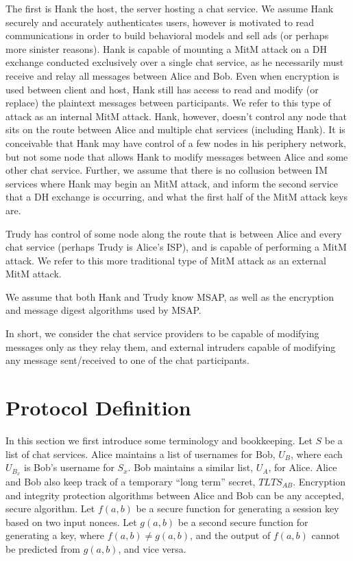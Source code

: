 \documentclass[twoside,10pt]{article}
\begin{document}
\begin{multicols}{2}
The first is Hank the host, the server hosting a chat service.  We assume Hank securely and accurately authenticates users, however is motivated to read communications in order to build behavioral models and sell ads (or perhaps more sinister reasons).  Hank is capable of mounting a MitM attack on a DH exchange conducted exclusively over a single chat service, as he necessarily must receive and relay all messages between Alice and Bob.  Even when encryption is used between client and host, Hank still has access to read and modify (or replace) the plaintext messages between participants.  We refer to this type of attack as an internal MitM attack.  Hank, however, doesn't  control any node that sits on the route between Alice and multiple chat services (including Hank).  It is conceivable that Hank may have control of a few nodes in his periphery network, but not some node that allows Hank to modify messages between Alice and some other chat service.  Further, we assume that there is no collusion between IM services where Hank may begin an MitM attack, and inform the second service that a DH exchange is occurring, and what the first half of the MitM attack keys are.

Trudy has control of some node along the route that is between Alice and every chat service (perhaps Trudy is Alice's ISP), and is capable of performing a MitM attack.  We refer to this more traditional type of MitM attack as an external MitM attack.

We assume that both Hank and Trudy know MSAP, as well as the encryption and message digest algorithms used by MSAP.

In short, we consider the chat service providers to be capable of modifying messages only as they relay them, and external intruders capable of modifying any message sent/received to one of the chat participants.  

\section{Protocol Definition}\label{sec:protoDef}
In this section we first introduce some terminology and bookkeeping.  Let $S$ be a list of chat services.  Alice maintains a list of usernames for Bob, $U_{B}$, where each $U_{B_x}$ is Bob's username for $S_x$.  Bob maintains a similar list, $U_{A}$, for Alice.  Alice and Bob also keep track of a temporary ``long term'' secret, $TLTS_{AB}$.  Encryption and integrity protection algorithms between Alice and Bob can be any accepted, secure algorithm.  Let $f(a,b)$ be a secure function for generating a session key based on two input nonces.  Let $g(a,b)$ be a second secure function for generating a key, where $f(a,b) \neq g(a,b)$, and the output of $f(a,b)$ cannot be predicted from $g(a,b)$, and vice versa.


\end{multicols}
\end{document}
